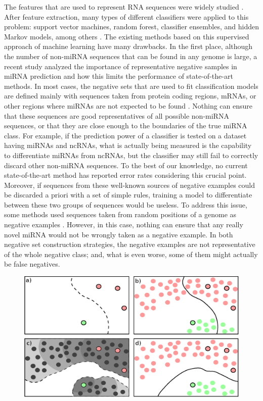 \documentclass{article}
\begin{document}
The features that are used to represent RNA sequences were widely studied \citep{de2014discriminant, yones2015mirnafe}. After feature extraction, many types of different classifiers were applied to this problem: support vector machines, random forest, classifier ensembles, and hidden Markov models, among others \citep{kleftogiannis2013where}. The existing methods based on this supervised approach of machine learning have many drawbacks. In the first place, although the number of non-miRNA sequences that can be found in any genome is large, a recent study \citep{wei2014improved} analyzed the importance of representative negative samples in miRNA prediction and how this limits the performance of state-of-the-art methods. In most cases, the negative sets that are used to fit classification models are defined mainly with sequences taken from protein coding regions, mRNAs, or other regions where miRNAs are not expected to be found \citep{peace2015framework}. Nothing can ensure that these sequences are good representatives of all possible non-miRNA sequences, or that they are close enough to the boundaries of the true miRNA class. For example, if the prediction power of a classifier is tested on a dataset having miRNAs and ncRNAs, what is actually being measured is the capability to differentiate miRNAs from ncRNAs, but the classifier may still fail to correctly discard other non-miRNA sequences. To the best of our knowledge, no current state-of-the-art method has reported error rates considering this crucial point. Moreover, if sequences from these well-known sources of negative examples could be discarded a priori with a set of simple rules, training a model to differentiate between these two groups of sequences would be useless. To address this issue, some methods used sequences taken from random positions of a genome as negative examples \citep{wenyuan2013training,gudys2013huntmi}. However, in this case, nothing can ensure that any really novel miRNA would not be wrongly taken as a negative example. In both negative set construction strategies, the negative examples are not representative of the whole negative class; and, what is even worse, some of them might actually be false negatives.
\begin{figure}[tpb]
	\centering
	\includegraphics[width=0.6\linewidth]{supervssemi2.eps}
	\label{fig:semivssuper}
\end{figure}
\end{document}
